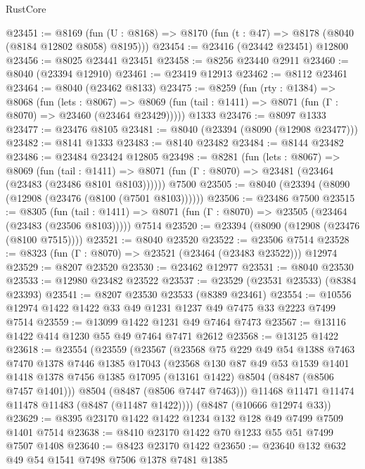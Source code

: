 \begin{lexlean}{RustCore}
\begin{coremodule}
@23451 := @8169
    (fun (U : @8168) => @8170 (fun (t : @47) => @8178 (@8040 (@8184 @12802 @8058) @8195)))
@23454 := @23416 (@23442 @23451) @12800
@23456 := @8025 @23441 @23451
@23458 := @8256 @23440 @2911
@23460 := @8040 (@23394 @12910)
@23461 := @23419 @12913
@23462 := @8112 @23461
@23464 := @8040 (@23462 @8133)
@23475 := @8259
    (fun (rty : @1384) =>
    @8068
      (fun (lets : @8067) =>
      @8069 (fun (tail : @1411) => @8071 (fun (Γ : @8070) => @23460 (@23464 @23429)))))
    @1333
@23476 := @8097 @1333
@23477 := @23476 @8105
@23481 := @8040 (@23394 (@8090 (@12908 @23477)))
@23482 := @8141 @1333
@23483 := @8140 @23482
@23484 := @8144 @23482
@23486 := @23484 @23424 @12805
@23498 := @8281
    (fun (lets : @8067) =>
    @8069
      (fun (tail : @1411) =>
      @8071 (fun (Γ : @8070) => @23481 (@23464 (@23483 (@23486 @8101 @8103))))))
    @7500
@23505 := @8040 (@23394 (@8090 (@12908 (@23476 (@8100 (@7501 @8103))))))
@23506 := @23486 @7500
@23515 := @8305
    (fun (tail : @1411) => @8071 (fun (Γ : @8070) => @23505 (@23464 (@23483 (@23506 @8103)))))
    @7514
@23520 := @23394 (@8090 (@12908 (@23476 (@8100 @7515))))
@23521 := @8040 @23520
@23522 := @23506 @7514
@23528 := @8323 (fun (Γ : @8070) => @23521 (@23464 (@23483 @23522))) @12974
@23529 := @8207 @23520
@23530 := @23462 @12977
@23531 := @8040 @23530
@23533 := @12980 @23482 @23522
@23537 := @23529 (@23531 @23533) (@8384 @23393)
@23541 := @8207 @23530 @23533 (@8389 @23461)
@23554 := @10556 @12974 @1422 @1422 @33 @49 @1231 @1237 @49 @7475 @33 @2223 @7499 @7514
@23559 := @13099 @1422 @1231 @49 @7464 @7473
@23567 := @13116 @1422 @414 @1230 @55 @49 @7464 @7471 @2612
@23568 := @13125 @1422
@23618 := @23554
    (@23559
      (@23567
        (@23568
          @75
          @229
          @49
          @54
          @1388
          @7463
          @7470
          @1378
          @7446
          @1385
          @17043
          (@23568
            @130
            @87
            @49
            @53
            @1539
            @1401
            @1418
            @1378
            @7456
            @1385
            @17095
            (@13161 @1422)
            @8504
            (@8487 (@8506 @7457 @1401)))
          @8504
          (@8487 (@8506 @7447 @7463)))
        @11468
        @11471
        @11474
        @11478
        @11483
        (@8487 (@11487 @1422))))
    (@8487 (@10666 @12974 @33))
@23629 := @8395 @23170 @1422 @1422 @1234 @132 @128 @49 @7499 @7509 @1401 @7514
@23638 := @8410 @23170 @1422 @70 @1233 @55 @51 @7499 @7507 @1408
@23640 := @8423 @23170 @1422
@23650 := @23640 @132 @632 @49 @54 @1541 @7498 @7506 @1378 @7481 @1385

\end{coremodule}
\end{lexlean}
